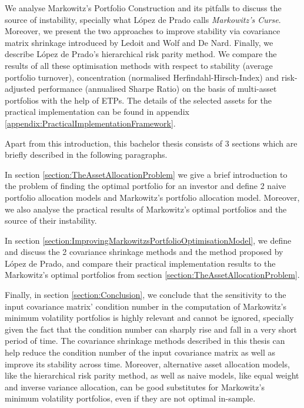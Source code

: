 We analyse Markowitz's Portfolio Construction and its pitfalls to discuss the source of instability, specially what López de Prado calls \textit{Markowitz's Curse}. Moreover, we present the two approaches to improve stability via covariance matrix shrinkage introduced by Ledoit and Wolf and De Nard. Finally, we describe López de Prado's hierarchical risk parity method. We compare the results of all these optimisation methods with respect to stability (average portfolio turnover), concentration (normalised Herfindahl-Hirsch-Index) and risk-adjusted performance (annualised Sharpe Ratio) on the basis of multi-asset portfolios with the help of ETPs. The details of the selected assets for the practical implementation can be found in appendix \ref{appendix:PracticalImplementationFramework}.

Apart from this introduction, this bachelor thesis consists of 3 sections which are briefly described in the following paragraphs.

In section \ref{section:TheAssetAllocationProblem} we give a brief introduction to the problem of finding the optimal portfolio for an investor and define 2 naive portfolio allocation models and Markowitz's portfolio allocation model. Moreover, we also analyse the practical results of Markowitz's optimal portfolios and the source of their instability.

In section \ref{section:ImprovingMarkowitzsPortfolioOptimisationModel}, we define and discuss the 2 covariance shrinkage methods and the method proposed by López de Prado, and compare their practical implementation results to the Markowitz's optimal portfolios from section \ref{section:TheAssetAllocationProblem}.

Finally, in section \ref{section:Conclusion}, we conclude that the sensitivity to the input covariance matrix' condition number in the computation of Markowitz's minimum volatility portfolios is highly relevant and cannot be ignored, specially given the fact that the condition number can sharply rise and fall in a very short period of time. The covariance shrinkage methods described in this thesis can help reduce the condition number of the input covariance matrix as well as improve its stability across time. Moreover, alternative asset allocation models, like the hierarchical risk parity method, as well as naive models, like equal weight and inverse variance allocation, can be good substitutes for Markowitz's minimum volatility portfolios, even if they are not optimal in-sample.